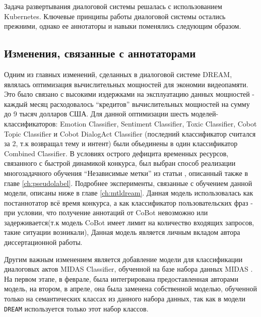 Задача развертывания диалоговой системы решалась с использованием Kubernetes. \cite{kubernetes}
Ключевые принципы работы диалоговой системы остались прежними, однако ее аннотаторы и навыки поменялись следующим образом.

\subsection{Изменения, связанные с аннотаторами}\label{dream:2:ann}

Одним из главных изменений, сделанных в диалоговой системе DREAM, являлась оптимизация вычислительных мощностей для экономии видеопамяти. Это было связано с высокими издержками на эксплуатацию данных мощностей - каждый месяц расходовалось “кредитов” вычислительных мощностей на сумму до 9 тысяч долларов США. Для данной оптимизации шесть моделей-классификаторов: Emotion Classifier, Sentiment Classifier, Toxic Classifier, Cobot Topic Classifier и Cobot DialogAct Classifier (последний классификатор считался за 2, т.к возвращал тему и интент) были объединены в один классификатор Combined Classifier. В условиях острого дефицита временных ресурсов, связанного с быстрой динамикой конкурса, был выбран способ реализации многозадачного обучения “Независимые метки” из статьи  \cite{pseudolabel}, описанный также в главе \ref{ch:pseudolabel}. Подробнее эксперименты, связанные с обучением данной модели, описаны ниже в главе \ref{ch:mtldream}. Данная модель использовалась как постаннотатор всё время конкурса, а как классификатор пользовательских фраз - при условии, что получение аннотаций от CoBot невозможно или задерживается(т.к модель CoBot имеет лимит на количество входящих запросов, такие ситуации возникали),  Данная модель является личным вкладом автора диссертационной работы.

Другим важным изменением является добавление модели для классификации диалоговых актов MIDAS Classifier, обученной на базе набора данных MIDAS \cite{midas}. На первом этапе, в феврале, была интегрирована предоставленная авторами модель, на втором, в апреле, она была заменена собственной моделью, обученной только на семантических классах из данного набора данных, так как в модели \texttt{DREAM} используется только этот набор классов.


